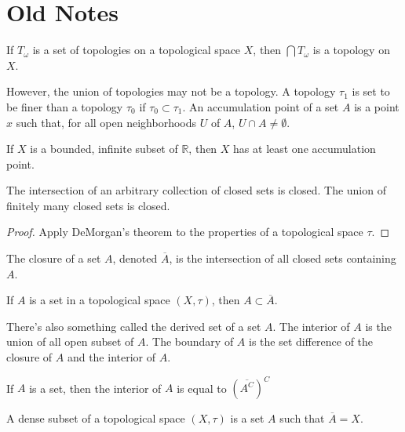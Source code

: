 \section{Old Notes}
    \begin{theorem}
        If $T_{\omega}$ is a set of topologies on
        a topological space $X$, then
        $\bigcap{T_{\omega}}$ is a topology on $X$.
    \end{theorem}
    However, the union of topologies may not be a
    topology. A topology $\tau_{1}$ is set to
    be finer than a topology $\tau_{0}$ if
    $\tau_{0}\subset\tau_{1}$. An accumulation point
    of a set $A$ is a point $x$ such that, for
    all open neighborhoods $U$ of $A$,
    $U\cap{A}\ne\emptyset$.
    \begin{theorem}
        If $X$ is a bounded, infinite subset of
        $\mathbb{R}$, then $X$ has at least
        one accumulation point.
    \end{theorem}
    \begin{theorem}
        The intersection of an arbitrary collection of
        closed sets is closed. The union of finitely
        many closed sets is closed.
    \end{theorem}
    \begin{proof}
        Apply DeMorgan's theorem to the properties
        of a topological space $\tau$.
    \end{proof}
    \begin{definition}
        The closure of a set $A$,
        denoted $\overline{A}$, is the
        intersection of all closed sets
        containing $A$.
    \end{definition}
    \begin{theorem}
        If $A$ is a set in a topological space
        $(X,\tau)$, then $A\subset\overline{A}$.
    \end{theorem}
    There's also something called the derived
    set of a set $A$. The interior of $A$
    is the union of all open subset of $A$.
    The boundary of $A$ is the set difference
    of the closure of $A$ and the interior of
    $A$.
    \begin{theorem}
        If $A$ is a set, then
        the interior of $A$ is equal to
        $(\overline{A^{C}})^{C}$
    \end{theorem}
    \begin{definition}
        A dense subset of a topological
        space $(X,\tau)$ is a set $A$
        such that $\overline{A}=X$.
    \end{definition}
